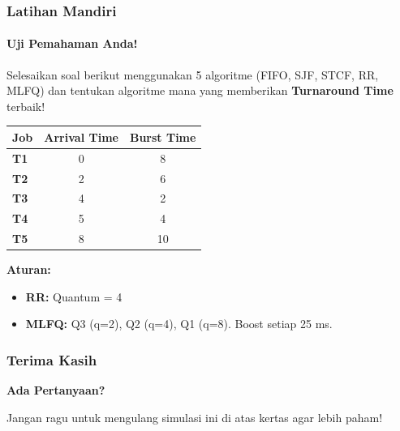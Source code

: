 \documentclass[t,aspectratio=169,xcolor=dvipsnames]{beamer}
\begin{document}
\begin{frame}
    \frametitle{Latihan Mandiri}
    \framesubtitle{Uji Pemahaman Anda!}
    \scriptsize
    Selesaikan soal berikut menggunakan 5 algoritme (FIFO, SJF, STCF, RR, MLFQ) dan tentukan algoritme mana yang memberikan \textbf{Turnaround Time} terbaik!
    \vspace{0.2cm}
    \begin{table}[]
        \centering
        \begin{tabular}{lcc}
            \toprule
            \textbf{Job} & \textbf{Arrival Time} & \textbf{Burst Time} \\
            \midrule
            \textbf{T1} & 0 & 8 \\
            \textbf{T2} & 2 & 6 \\
            \textbf{T3} & 4 & 2 \\
            \textbf{T4} & 5 & 4 \\
            \textbf{T5} & 8 & 10 \\
            \bottomrule
        \end{tabular}
    \end{table}
    \vspace{0.2cm}
    \textbf{Aturan:}
    \begin{itemize}
        \item \textbf{RR:} Quantum = 4
        \item \textbf{MLFQ:} Q3 (q=2), Q2 (q=4), Q1 (q=8). Boost setiap 25 ms.
    \end{itemize}
\end{frame}

\begin{frame}
    \frametitle{Terima Kasih}
    \begin{center}
        \Huge \textbf{Ada Pertanyaan?}
        
        \vspace{1cm}
        \normalsize
        Jangan ragu untuk mengulang simulasi ini di atas kertas agar lebih paham!
    \end{center}
\end{frame}
\end{document}
